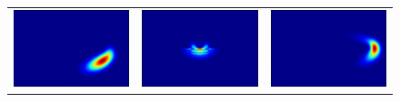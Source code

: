 \begin{figure}[H]
\begin{tabular}{ccc}
  \includegraphics[scale = 0.29]{QHO4.png}  &   \includegraphics[scale = 0.29]{slit5.png}   &   \includegraphics[scale = 0.29]{QHO6.png} \\

\end{tabular}
\end{figure}
